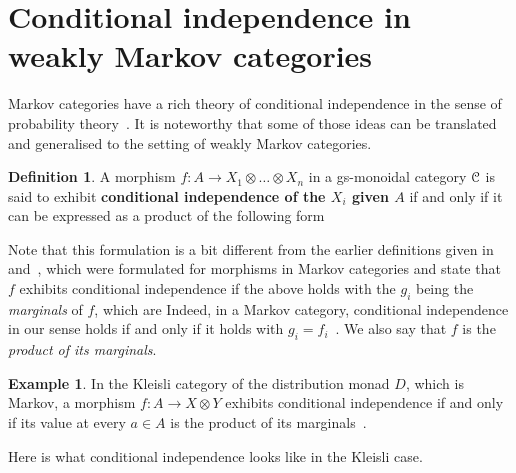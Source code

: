 \documentclass[a4paper,UKenglish,numberwithinsect,cleveref, autoref, thm-restate]{lipics-v2021}
\theoremstyle{plain} %
\theoremstyle{definition} %
\newtheorem{mydefinition}[mytheorem]{Definition}
\newtheorem{myexample}[mytheorem]{Example}
\begin{document}
\section{Conditional independence in weakly Markov categories}
\label{secindep}

Markov categories have a rich theory of conditional independence in the sense of probability theory~\cite{fritz2022dseparation}. 
It is noteworthy that some of those ideas can be translated and generalised to the setting of weakly Markov categories. 

\begin{mydefinition}\label{defcondind}
 A morphism $f:A\to X_1\otimes\dots\otimes X_n$ in a gs-monoidal category $\mathcal{C}$ is said to exhibit \textbf{conditional independence of the $X_i$ given $A$} if and only if it can be expressed as a product of the following form
\end{mydefinition}

Note that this formulation is a bit different from the earlier definitions given in \cite[Definition~6.6]{cho_jacobs_2019} and~\cite[Definition~12.12]{Fritz_2020}, which were formulated for morphisms in Markov categories and state that $f$ exhibits conditional independence if the above holds with the $g_i$ being the \emph{marginals} of $f$, which are
Indeed, in a Markov category, conditional independence in our sense holds if and only if it holds with $g_i = f_i$~\cite[Lemma~12.11]{Fritz_2020}.
We also say that $f$ is the \emph{product of its marginals}.

\begin{myexample}
 In the Kleisli category of the distribution monad $D$, which is Markov, a morphism $f:A\to X\otimes Y$ exhibits conditional independence if and only if its value at every $a \in A$ is the product of its marginals~\cite[Section~12]{Fritz_2020}.
\end{myexample}

Here is what conditional independence looks like in the Kleisli case.
\end{document}
